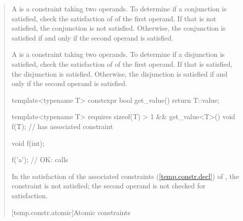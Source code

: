 \begin{quote}
\begin{addedblock}
\pnum
A  is a constraint taking two 
operands. 
% 
To determine if a conjunction is satisfied, check the satisfaction of
of the first operand. If that is not satisfied, the conjunction is not
satisfied. Otherwise, the conjunction is satisfied if and only if the second
operand is satisfied.


\pnum
A  is a constraint taking two 
operands. 
% 
To determine if a disjunction is satisfied, check the satisfaction of
of the first operand. If that is satisfied, the disjunction is
satisfied. Otherwise, the disjunction is satisfied if and only if the second
operand is satisfied.

\pnum
\enterexample
\begin{codeblock}
template<typename T>
  constexpr bool get_value() { return T::value; }

template<typename T>
  requires sizeof(T) > 1 && get_value<T>()
    void f(T);   // has associated constraint 

void f(int);

f('a'); // OK: calls 
\end{codeblock}
In the satisfaction of the associated constraints (\ref{temp.constr.decl}) 
of , the constraint  is not satisfied; 
the second operand is not checked for satisfaction.
\exitexample


[temp.constr.atomic]{Atomic constraints}


\end{addedblock}
\end{quote}
